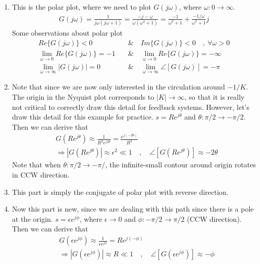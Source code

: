 \documentclass[twoside]{article}
\begin{document}
\begin{enumerate}
  \item This is the polar plot, where we need to plot $G(j \omega)$, where $\omega : 0 \to
    \infty$. 
    \begin{align*}
      G(j \omega) = \frac{1}{j \omega (j \omega +1)} = \frac{ -j  - \omega }{\omega
      (\omega^2 + 1) } = \frac{-1}{\omega^2 + 1} + \frac{-1/\omega}{
      \omega^2 + 1} j
    \end{align*}
%
   Some observations about polar plot
    \begin{align*}
       Re \lbrace G(j \omega) \rbrace < 0 \quad & \&  \quad  Im \lbrace G(j
                                                \omega) \rbrace < 0 \quad , \ \forall  \omega > 0 
      \\
        \lim_{\omega \to 0} Re \lbrace G(j \omega) \rbrace = - 1
       \quad & \& \quad
       \lim_{\omega \to 0} Re \lbrace G(j \omega) \rbrace = - \infty
        \\
       \lim_{\omega \to \infty} | G(j \omega) | = 0
        \quad & \& \quad
      \lim_{\omega \to \infty} \angle [ G(j \omega) ] = -\pi
      \end{align*}
  \item Note that since we are now only interested in the circulation around
    $-1/K$. The origin in the Nyquist plot corresponds to $| K | \to
    \infty$, so that it is really not critical to correctly draw this
    detail for feedback systems. 
     However, let's draw this detail for this example for practice. 
     $s = R e^{j \theta}$ and $\theta : \pi/2 \to -\pi/2$.  Then 
   we can derive that  
   \begin{align*}
     & G \left( R e^{j \theta} \right) \approx \frac{1}{R^2 e^{j
       2 \theta}} = \frac{e^{j (-2 \theta)}}{R^2}
       \\
    &\Rightarrow | G \left( R e^{j \theta} \right) | \approx
      \epsilon^2 \ll 1
   \quad , \quad \angle [ G \left( R e^{j \theta} \right) ] \approx -2
      \theta
   \end{align*}
   Note that when $\theta : \pi/2 \to -\pi/$, the infinite-small 
   contour around origin rotates in CCW direction. 
   \item This part is simply the conjugate of polar plot with reverse
     direction. 
  \item Now this part is new, since we are dealing with this path
    since there is a pole at the origin. 
     $s = \epsilon e^{j \phi}$, where $\epsilon \to 0$ and $\phi :
     -\pi/2 \to \pi/2$ (CCW direction).  Then  we can derive that  
   \begin{align*}
     & G \left( \epsilon e^{j \phi} \right) \approx \frac{1}{\epsilon e^{j
        \phi}} = R e^{j (-\phi)}
       \\
    &\Rightarrow | G \left(\epsilon e^{j \phi} \right) | \approx
     R \ll 1
   \quad , \quad \angle [ G \left( \epsilon e^{j \phi} \right) ] \approx -\phi
   \end{align*}
\end{enumerate}
\end{document}
